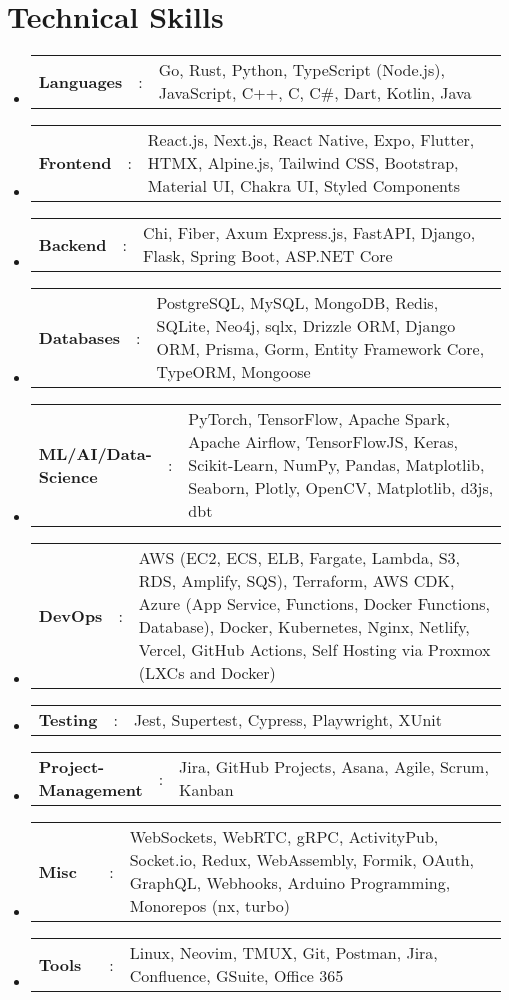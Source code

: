 \documentclass[a4paper,11pt]{article}
\newcommand{\resumeSectionType}[3]{
  \item\begin{tabular*}{0.96\textwidth}[t]{
    p{0.15\linewidth}p{0.02\linewidth}p{0.81\linewidth}
  }
    \textbf{#1} & #2 & #3
  \end{tabular*}\vspace{-2pt}
}
\newcommand{\resumeHeadingListStart}{
  \begin{itemize}[leftmargin=0.15in, label={}]
}
\newcommand{\resumeHeadingListEnd}{\end{itemize}}
\begin{document}
\section{\LARGE{Technical Skills}}
  \resumeHeadingListStart{}
    \resumeSectionType{Languages}{:}{Go, Rust, Python, TypeScript (Node.js), JavaScript, C++, C, C\#, Dart, Kotlin, Java}
    \resumeSectionType{Frontend}{:}{React.js, Next.js, React Native, Expo, Flutter, HTMX, Alpine.js, Tailwind CSS, Bootstrap, Material UI, Chakra UI, Styled Components}
    \resumeSectionType{Backend}{:}{Chi, Fiber, Axum Express.js, FastAPI, Django, Flask, Spring Boot, ASP.NET Core}
    \resumeSectionType{Databases}{:}{PostgreSQL, MySQL, MongoDB, Redis, SQLite, Neo4j, sqlx, Drizzle ORM, Django ORM, Prisma, Gorm, Entity Framework Core, TypeORM, Mongoose}
	\resumeSectionType{ML/AI/Data-Science}{:}{PyTorch, TensorFlow, Apache Spark, Apache Airflow, TensorFlowJS, Keras, Scikit-Learn, NumPy, Pandas, Matplotlib, Seaborn, Plotly, OpenCV, Matplotlib, d3js, dbt}
    \resumeSectionType{DevOps}{:}{AWS (EC2, ECS, ELB, Fargate, Lambda, S3, RDS, Amplify, SQS), Terraform, AWS CDK, Azure (App Service, Functions, Docker Functions, Database), Docker, Kubernetes, Nginx, Netlify, Vercel, GitHub Actions, Self Hosting via Proxmox (LXCs and Docker)}
	\resumeSectionType{Testing}{:}{Jest, Supertest, Cypress, Playwright, XUnit}
	\resumeSectionType{Project-Management}{:}{Jira, GitHub Projects, Asana, Agile, Scrum, Kanban}
	\resumeSectionType{Misc}{:}{WebSockets, WebRTC, gRPC, ActivityPub, Socket.io, Redux, WebAssembly, Formik, OAuth, GraphQL, Webhooks, Arduino Programming, Monorepos (nx, turbo)}
	\resumeSectionType{Tools}{:}{Linux, Neovim, TMUX, Git, Postman, Jira, Confluence, GSuite, Office 365}
  \resumeHeadingListEnd{}


\end{document}
